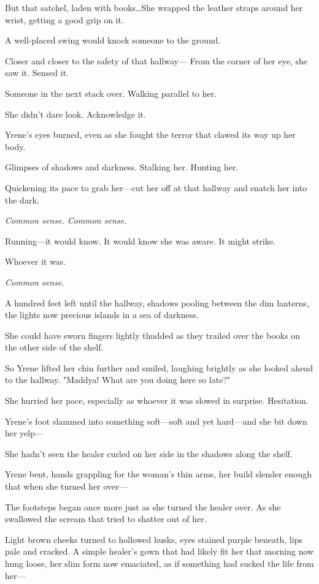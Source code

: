 But that satchel, laden with books\ldots She wrapped the leather straps around her wrist, getting a good grip on it.

A well-placed swing would knock someone to the ground.

Closer and closer to the safety of that hallway--- From the corner of her eye, she saw it.
Sensed it.

Someone in the next stack over.
Walking parallel to her.

She didn't dare look.
Acknowledge it.

Yrene's eyes burned, even as she fought the terror that clawed its way up her body.

Glimpses of shadows and darkness.
Stalking her.
Hunting her.

Quickening its pace to grab her---cut her off at that hallway and snatch her into the dark.

\emph{Common sense.
Common sense.}

Running---it would know.
It would know she was aware.
It might strike.

Whoever it was.

\emph{Common sense}.

A hundred feet left until the hallway, shadows pooling between the dim lanterns, the lights now precious islands in a sea of darkness.

She could have sworn fingers lightly thudded as they trailed over the books on the other side of the shelf.

So Yrene lifted her chin further and smiled, laughing brightly as she looked ahead to the hallway.
"Maddya!
What are you doing here so late?"

She hurried her pace, especially as whoever it was slowed in surprise.
Hesitation.

Yrene's foot slammed into something soft---soft and yet hard---and she bit down her yelp---

She hadn't seen the healer curled on her side in the shadows along the shelf.

Yrene bent, hands grappling for the woman's thin arms, her build slender enough that when she turned her over---

The footsteps began once more just as she turned the healer over.
As she swallowed the scream that tried to shatter out of her.

Light brown cheeks turned to hollowed husks, eyes stained purple beneath, lips pale and cracked.
A simple healer's gown that had likely fit her that morning now hung loose, her slim form now emaciated, as if something had sucked the life from her---

